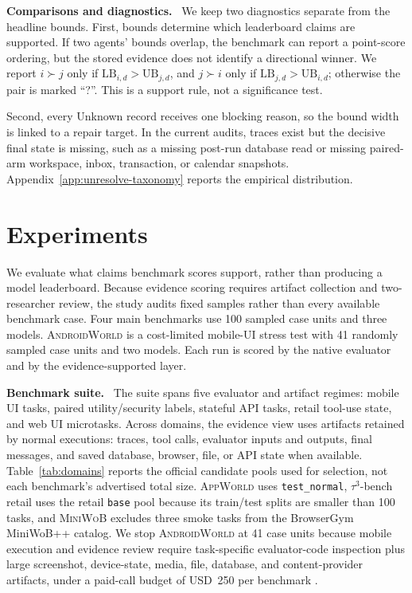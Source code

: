 \documentclass{article}
\newcommand{\appworld}{\textsc{AppWorld}\xspace}
\newcommand{\tauthree}{\(\tau^3\)-bench retail\xspace}
\newcommand{\androidworld}{\textsc{AndroidWorld}\xspace}
\newcommand{\miniwob}{\textsc{MiniWoB}\xspace}
\newcommand{\unknownLabel}{Unknown\xspace}
\newcommand{\runin}[1]{\noindent\textbf{#1}\ }
\begin{document}
\runin{Comparisons and diagnostics.}
\label{sec:interval-meaning}
\label{sec:pairwise}
We keep two diagnostics separate from the headline bounds. First, bounds
determine which leaderboard claims are supported. If two
agents' bounds overlap, the benchmark can report a point-score ordering,
but the stored evidence does not identify a directional winner. We report
\(i\succ j\) only if \(\mathrm{LB}_{i,d}>\mathrm{UB}_{j,d}\), and \(j\succ i\)
only if \(\mathrm{LB}_{j,d}>\mathrm{UB}_{i,d}\); otherwise the pair is marked
``?''. This is a support rule, not a significance test.

Second, every \unknownLabel record receives one blocking reason, so the bound
width is linked to a repair target. In the current audits, traces exist but the
decisive final state is missing, such as a missing post-run
database read or missing paired-arm workspace, inbox, transaction, or calendar
snapshots.
Appendix~\ref{app:unresolve-taxonomy} reports the empirical distribution.

\section{Experiments}
\label{sec:study-design}
\label{sec:experimental-setup}
\label{sec:experiments}

We evaluate what claims benchmark scores support, rather than producing a model
leaderboard. Because evidence scoring requires artifact collection and
two-researcher review, the study audits fixed samples rather than every
available benchmark case. Four main benchmarks use 100 sampled case units and
three models. \androidworld is a cost-limited mobile-UI stress test with 41
randomly sampled case units and two models. Each run is scored by the native evaluator
and by the evidence-supported layer.

\runin{Benchmark suite.}
The suite spans five evaluator and artifact regimes: mobile UI tasks, paired
utility/security labels, stateful API tasks, retail tool-use state, and web UI
microtasks. Across domains, the evidence view uses artifacts retained by normal
executions: traces, tool calls, evaluator inputs and outputs, final messages, and
saved database, browser, file, or API state when available.
Table~\ref{tab:domains} reports the official candidate pools used for
selection, not each benchmark's advertised total size. \appworld
uses \texttt{test\_normal}, \tauthree uses the retail \texttt{base} pool because
its train/test splits are smaller than 100 tasks, and \miniwob excludes three
smoke tasks from the BrowserGym MiniWoB++ catalog. We stop \androidworld at
41 case units because mobile execution and evidence review require
task-specific evaluator-code inspection plus large screenshot, device-state,
media, file, database, and content-provider artifacts, under a paid-call budget
of USD~250 per benchmark
\citep{rawles2025androidworlddynamicbenchmarkingenvironment,barres2026tau3bench,yao2024tau,agentdojo,appworld2024,liu2018reinforcement,lesellierdechezelles2024browsergym}.
\end{document}
